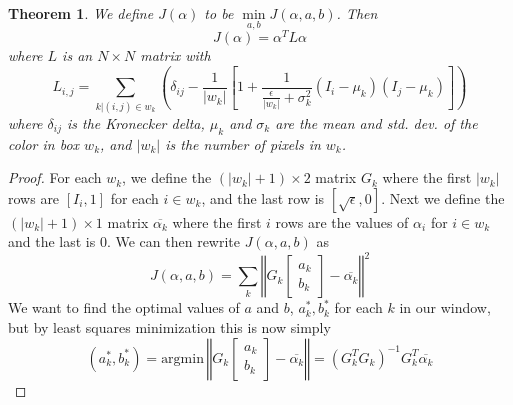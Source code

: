 \newtheorem{matlapthm}{Theorem}
\begin{matlapthm}
We define $J(\alpha)$ to be $\min\limits_{a,b} J(\alpha,a,b)$. Then
\[J(\alpha)=\alpha^{T}L\alpha\]
where $L$ is an $N\times N$ matrix with
\[L_{i,j}=\sum_{k|(i,j)\in w_k}\left(
	\delta_{ij}-\frac{1}{|w_k|}\left[
	1+\frac{1}{\frac{\epsilon}{|w_k|}+\sigma_k^2}
	(I_i-\mu_k)(I_j-\mu_k)
\right]\right)\]
where $\delta_{ij}$ is the Kronecker delta, $\mu_k$ and $\sigma_k$ are the mean and std. dev. of the color in box $w_k$, and $|w_k|$ is the number of pixels in $w_k$.
\end{matlapthm}
\begin{proof}
For each $w_k$, we define the $(|w_k|+1)\times2$ matrix $G_k$ where the first $|w_k|$ rows are $[I_i,1]$ for each $i\in w_k$, and the last row is $[\sqrt{\epsilon},0]$. Next we define the $(|w_k|+1)\times1$ matrix $\overline{\alpha_k}$ where the first $i$ rows are the values of $\alpha_i$ for $i\in w_k$ and the last is $0$. We can then rewrite $J(\alpha,a,b)$ as
\[J(\alpha,a,b)=\sum_k\left\Vert
G_k\left[\begin{array}{cc}
a_k \\ b_k
\end{array}\right]
 - \overline{\alpha_k}
\right\Vert^2\]
We want to find the optimal values of $a$ and $b$, $a_k^{*},b_k^{*}$ for each $k$ in our window, but by least squares minimization this is now simply
\[(a_k^*,b_k^*)=\text{argmin}\,
\left\Vert
G_k\left[\begin{array}{cc}
a_k \\ b_k
\end{array}\right]
 - \overline{\alpha_k}
\right\Vert=(G_k^{T}G_k)^{-1}G_k^{T}\overline{\alpha_k}\]

\end{proof}